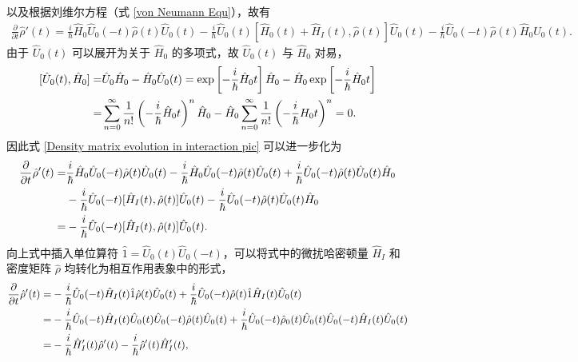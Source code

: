 \documentclass{thesis}
\begin{document}
以及根据刘维尔方程（式 \eqref{von Neumann Equ}），故有
\begin{align}
    \label{Density matrix evolution in interaction pic}
    \frac{\partial}{\partial t}\hat{\rho}'(t)=\frac{i}{\hbar}\hat{H}_0\hat{U}_0(-t)\hat{\rho}(t)\hat{U}_0(t)-\frac{i}{\hbar}\hat{U}_0(t)[\hat{H}_0(t)+\hat{H}_I(t),\hat{\rho}(t)]\hat{U}_0(t)-\frac{i}{\hbar}\hat{U}_0(-t)\hat{\rho}(t)\hat{H}_0\hat{U}_0(t).
\end{align}
由于 $\hat{U}_0(t)$ 可以展开为关于 $\hat{H}_0$ 的多项式，故 $\hat{U}_0(t)$ 与 $\hat{H}_0$ 对易，
\begin{align}
    \notag[\hat{U}_0(t),\hat{H}_0]=&\hat{U}_0\hat{H}_0-\hat{H}_0\hat{U}_0(t)=\exp\left[-\frac{i}{\hbar}\hat{H}_0t\right]\hat{H}_0-\hat{H}_0\exp\left[-\frac{i}{\hbar}\hat{H}_0t\right]\\
    =&\sum_{n=0}^{\infty}\frac{1}{n!}\left(-\frac{i}{\hbar}\hat{H}_0t\right)^n\hat{H}_0-\hat{H}_0\sum_{n=0}^{\infty}\frac{1}{n!}\left(-\frac{i}{\hbar}H_0t\right)^n=0.
\end{align}
因此式 \eqref{Density matrix evolution in interaction pic} 可以进一步化为
\begin{align}
    \notag\frac{\partial}{\partial t}\hat{\rho}'(t)=&\frac{i}{\hbar}\hat{H}_0\hat{U}_0(-t)\hat{\rho}(t)\hat{U}_0(t)-\frac{i}{\hbar}\hat{H}_0\hat{U}_0(-t)\hat{\rho}(t)\hat{U}_0(t)+\frac{i}{\hbar}\hat{U}_0(-t)\hat{\rho}(t)\hat{U}_0(t)\hat{H}_0\\
    \notag&-\frac{i}{\hbar}\hat{U}_0(-t)[\hat{H}_I(t),\hat{\rho}(t)]\hat{U}_0(t)-\frac{i}{\hbar}\hat{U}_0(-t)\hat{\rho}(t)\hat{U}_0(t)\hat{H}_0\\
    =&-\frac{i}{\hbar}\hat{U}_0(-t)[\hat{H}_I(t),\hat{\rho}(t)]\hat{U}_0(t).
\end{align}
向上式中插入单位算符 $\hat{1}=\hat{U}_0(t)\hat{U}_0(-t)$，可以将式中的微扰哈密顿量 $\hat{H}_I$ 和密度矩阵 $\hat{\rho}$ 均转化为相互作用表象中的形式，
\begin{align}
    \notag\frac{\partial}{\partial t}\hat{\rho}'(t)=&-\frac{i}{\hbar}\hat{U}_0(-t)\hat{H}_I(t)\hat{1}\hat{\rho}(t)\hat{U}_0(t)+\frac{i}{\hbar}\hat{U}_0(-t)\hat{\rho}(t)\hat{1}\hat{H}_I(t)\hat{U}_0(t)\\
    \notag=&-\frac{i}{\hbar}\hat{U}_0(-t)\hat{H}_I(t)\hat{U}_0(t)\hat{U}_0(-t)\hat{\rho}(t)\hat{U}_0(t)+\frac{i}{\hbar}\hat{U}_0(-t)\hat{\rho}_0(t)\hat{U}_0(t)\hat{U}_0(-t)\hat{H}_I(t)\hat{U}_0(t)\\
    =&-\frac{i}{\hbar}\hat{H}_I'(t)\hat{\rho}'(t)-\frac{i}{\hbar}\hat{\rho}'(t)\hat{H}_I'(t),
\end{align}
\end{document}
